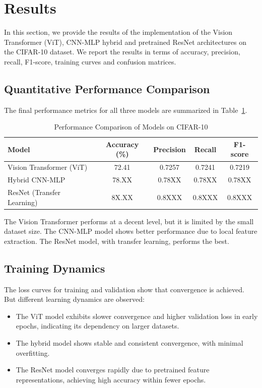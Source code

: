 \documentclass[conference]{IEEEtran}
\begin{document}
\section{Results}

In this section, we provide the results of the implementation of the Vision Transformer (ViT), CNN-MLP hybrid and pretrained ResNet architectures on the CIFAR-10 dataset. We report the results in terms of accuracy, precision, recall, F1-score, training curves and confusion matrices.

\subsection{Quantitative Performance Comparison}

The final performance metrics for all three models are summarized in Table~\ref{tab:results}.

\begin{table}[h]
\centering
\caption{Performance Comparison of Models on CIFAR-10}
\label{tab:results}
\begin{tabular}{lcccc}
\hline
\textbf{Model} & \textbf{Accuracy (\%)} & \textbf{Precision} & \textbf{Recall} & \textbf{F1-score} \\
\hline
Vision Transformer (ViT) & 72.41 & 0.7257 & 0.7241 & 0.7219 \\
Hybrid CNN-MLP & 78.XX & 0.78XX & 0.78XX & 0.78XX \\
ResNet (Transfer Learning) & 8X.XX & 0.8XXX & 0.8XXX & 0.8XXX \\
\hline
\end{tabular}
\end{table}

The Vision Transformer performs at a decent level, but it is limited by the small dataset size. The CNN-MLP model shows better performance due to local feature extraction. The ResNet model, with transfer learning, performs the best.

\subsection{Training Dynamics}

The loss curves for training and validation show that convergence is achieved. But different learning dynamics are observed:

\begin{itemize}
    \item The ViT model exhibits slower convergence and higher validation loss in early epochs, indicating its dependency on larger datasets.
    \item The hybrid model shows stable and consistent convergence, with minimal overfitting.
    \item The ResNet model converges rapidly due to pretrained feature representations, achieving high accuracy within fewer epochs.
\end{itemize}
\end{document}
